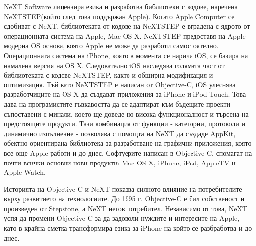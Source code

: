 NeXT Software лицензира езика и разработва библиотеки с кодове, наречена NeXTSTEP(който след това поддържан Apple). Когато Apple Computer се сдобиват с NeXT, библиотеката от кодове на NeXTSTEP е вградена с ядрото от операционната система на Apple, Mac OS X. NeXTSTEP предоставя на Apple модерна OS основа, която Apple не може да разработи самостоятелно. Операционната система на iPhone, която в момента се нарича iOS, се базира на намалена версия на OS X. Следователно iOS наследява голямата част от библиотеката с кодове NeXTSTEP, както и обширна модификация и оптимизация. Тъй като NeXTSTEP е написан от Objective-C, iOS улеснява разработчиците на OS X да създават приложения за iPhone и iPod Touch. Това дава на програмистите гъвкавостта да се адаптират към бъдещите проекти съпоставени с минали, което ще доведе но висока функционалност и търсена на предстоящите продукти. Тази комбинация от функции - категории, протоколи и динамично изпълнение - позволява с помощта на NeXT да създаде AppKit, обектно-ориентирана библиотека за разработване на графични приложения, която все още Apple работи и до днес. Софтуерите  написан в Objective-C, спомагат на почти всички основни нови продукти: Mac OS X, iPhone, iPad, AppleTV и Apple Watch.

Историята на Objective-C и NeXT показва силното влияние на потребителите върху развитието на технологиите. До 1995 г. Objective-C е бил собственост и произведен от Stepstone, а NeXT  негов потребител. Независимо от това, NeXT успя да промени Objective-C за да задоволи нуждите и интересите на Apple, като в крайна сметка трансформира езика за iPhone на който се разбработва и до днес.

